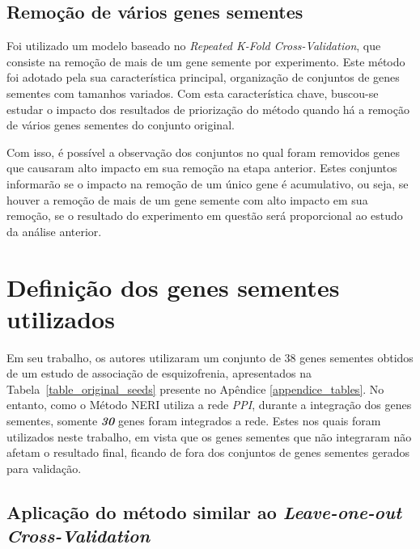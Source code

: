 

\subsection{Remoção de vários genes sementes}

Foi utilizado um modelo baseado no \textsl{Repeated K-Fold Cross-Validation}, que consiste na remoção de mais de um gene semente por experimento.
%
Este método foi adotado pela sua característica principal, organização de conjuntos de genes sementes com tamanhos variados.
Com esta característica chave, buscou-se estudar o impacto dos resultados de priorização do método quando há a remoção de vários genes sementes do conjunto original.

% 
Com isso, é possível a observação dos conjuntos no qual foram removidos genes que causaram alto impacto em sua remoção na etapa anterior. Estes conjuntos informarão se o impacto na remoção de um único gene é acumulativo, ou seja, se houver a remoção de mais de um gene semente com alto impacto em sua remoção, se o resultado do experimento em questão será proporcional ao estudo da análise anterior.

\section{Definição dos genes sementes utilizados}

%
Em seu trabalho, os autores \cite{Simoes2015} utilizaram um conjunto de 38 genes sementes obtidos de um estudo de associação de esquizofrenia, apresentados na Tabela~\ref{table_original_seeds} presente no Apêndice \ref{appendice_tables}.
%
%
No entanto, como o Método NERI utiliza a rede \textsl{PPI}, durante a integração dos genes sementes, somente \textsl{\textbf{30}} genes foram integrados a rede. Estes nos quais foram utilizados neste trabalho, em vista que os genes sementes que não integraram não afetam o resultado final, ficando de fora dos conjuntos de genes sementes gerados para validação.

\subsection{Aplicação do método similar ao  \textsl{Leave-one-out Cross-Validation}}

